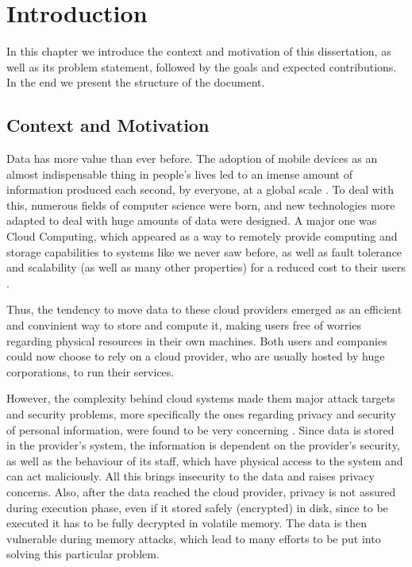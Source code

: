 \newcommand{\novathesis}{\emph{novathesis}}
\newcommand{\novathesisclass}{\texttt{novathesis.cls}}


\chapter{Introduction}
\label{cha:introduction}

In this chapter we introduce the context and motivation of this dissertation, as well as its problem statement, followed by the goals and expected contributions. In the end we present the structure of the document.




\section{Context and Motivation}
Data has more value than ever before. 
The adoption of mobile devices as an almost indispensable thing in people's lives led to an imense amount of information produced each second, by everyone, at a global scale \cite{dataAnalysis1}\cite{dataAnalysis2}.
To deal with this, numerous fields of computer science were born, and new technologies more adapted to deal with huge amounts of data were designed. 
A major one was Cloud Computing, which appeared as a way to remotely provide computing and storage capabilities to systems like we never saw before, as well as fault tolerance and scalability (as well as many other properties) for a reduced cost to their users \cite{cloudOrigins}. 

Thus, the tendency to move data to these cloud providers emerged as an efficient and convinient way to store and compute it, making users free of worries regarding physical resources in their own machines. Both users and companies could now choose to rely on a cloud provider, who are usually hosted by huge corporations, to run their services.

However, the complexity behind cloud systems made them major attack targets \cite{cloudAttacksReport} and security problems, more specifically the ones regarding privacy and security of personal information, were found to be very concerning \cite{playstationAttack}. 
Since data is stored in the provider's system, the information is dependent on the provider's security, as well as the behaviour of its staff, which have physical access to the system and can act maliciously. All this brings insecurity to the data and raises privacy concerns.
Also, after the data reached the cloud provider, privacy is not assured during execution phase, even if it stored safely (encrypted) in disk, since to be executed it has to be fully decrypted in volatile memory. The data is then vulnerable during memory attacks, which lead to many efforts to be put into solving this particular problem.  


